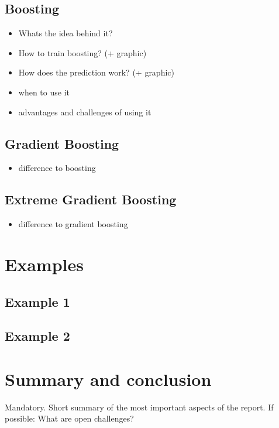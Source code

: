 \subsection{Boosting}
\begin{itemize}
    \item Whats the idea behind it?
    \item How to train boosting? (+ graphic)
    \item How does the prediction work? (+ graphic)
    \item when to use it
    \item advantages and challenges of using it
\end{itemize}

\subsection{Gradient Boosting}
\begin{itemize}
    \item difference to boosting
\end{itemize}

\subsection{Extreme Gradient Boosting}
\begin{itemize}
    \item difference to gradient boosting
\end{itemize}


\section{Examples}
\subsection{Example 1}
\subsection{Example 2}

\section{Summary and conclusion}
Mandatory. Short summary of the most important aspects of the report.
If possible: What are open challenges?

